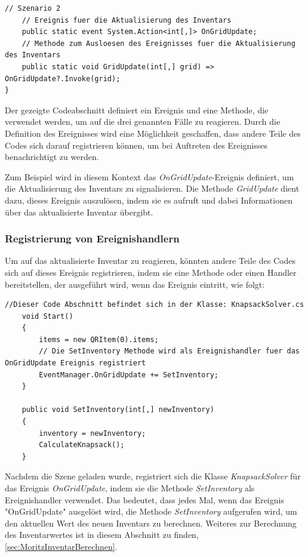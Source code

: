 \begin{itemize}
\begin{lstlisting}[style=csharp, label=code:EventManager]
    // Szenario 2
    // Ereignis fuer die Aktualisierung des Inventars
    public static event System.Action<int[,]> OnGridUpdate;
    // Methode zum Ausloesen des Ereignisses fuer die Aktualisierung des Inventars
    public static void GridUpdate(int[,] grid) => OnGridUpdate?.Invoke(grid);
}
\end{lstlisting}

Der gezeigte Codeabschnitt definiert ein Ereignis und eine Methode, die verwendet werden, um auf die drei genannten Fälle zu reagieren. Durch die Definition des Ereignisses wird eine Möglichkeit geschaffen, dass andere Teile des Codes sich darauf registrieren können, um bei Auftreten des Ereignisses benachrichtigt zu werden.

Zum Beispiel wird in diesem Kontext das \textit{OnGridUpdate}-Ereignis definiert, um die Aktualisierung des Inventars zu signalisieren. Die Methode \textit{GridUpdate} dient dazu, dieses Ereignis auszulösen, indem sie es aufruft und dabei Informationen über das aktualisierte Inventar übergibt.

\subsubsection*{Registrierung von Ereignishandlern}
Um auf das aktualisierte Inventar zu reagieren, könnten andere Teile des Codes sich auf dieses Ereignis registrieren, indem sie eine Methode oder einen Handler bereitstellen, der ausgeführt wird, wenn das Ereignis eintritt, wie folgt:

\begin{lstlisting}[style=csharp label=code:Event Registration]
    //Dieser Code Abschnitt befindet sich in der Klasse: KnapsackSolver.cs
    void Start()
    {
        items = new QRItem(0).items;
        // Die SetInventory Methode wird als Ereignishandler fuer das OnGridUpdate Ereignis registriert
        EventManager.OnGridUpdate += SetInventory;
    }

    public void SetInventory(int[,] newInventory)
    {
        inventory = newInventory;
        CalculateKnapsack();
    }
\end{lstlisting}

Nachdem die Szene geladen wurde, registriert sich die Klasse \textit{KnapsackSolver} für das Ereignis \textit{OnGridUpdate}, indem sie die Methode \textit{SetInventory} als Ereignishandler verwendet. Das bedeutet, dass jedes Mal, wenn das Ereignis "OnGridUpdate" ausgelöst wird, die Methode \textit{SetInventory} aufgerufen wird, um den aktuellen Wert des neuen Inventars zu berechnen. Weiteres zur Berechnung des Inventarwertes ist in diesem Abschnitt zu finden, \ref{sec:MoritzInventarBerechnen}.


\end{itemize}

